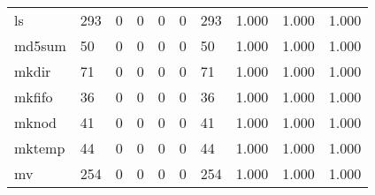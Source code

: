 \begin{longtable}{lp{1.3cm}p{1.3cm}p{1.3cm}p{1.3cm}p{1.3cm}p{1.3cm}p{1.3cm}p{1.3cm}p{1.3cm}}
ls        &                    293 &                                             0 &                                            0 &                                           0 &                                            0 &                                        293 &                                1.000 &                                  1.000 &                                1.000 \\
md5sum    &                     50 &                                             0 &                                            0 &                                           0 &                                            0 &                                         50 &                                1.000 &                                  1.000 &                                1.000 \\
mkdir     &                     71 &                                             0 &                                            0 &                                           0 &                                            0 &                                         71 &                                1.000 &                                  1.000 &                                1.000 \\
mkfifo    &                     36 &                                             0 &                                            0 &                                           0 &                                            0 &                                         36 &                                1.000 &                                  1.000 &                                1.000 \\
mknod     &                     41 &                                             0 &                                            0 &                                           0 &                                            0 &                                         41 &                                1.000 &                                  1.000 &                                1.000 \\
mktemp    &                     44 &                                             0 &                                            0 &                                           0 &                                            0 &                                         44 &                                1.000 &                                  1.000 &                                1.000 \\
mv        &                    254 &                                             0 &                                            0 &                                           0 &                                            0 &                                        254 &                                1.000 &                                  1.000 &                                1.000 \\

\end{longtable}
